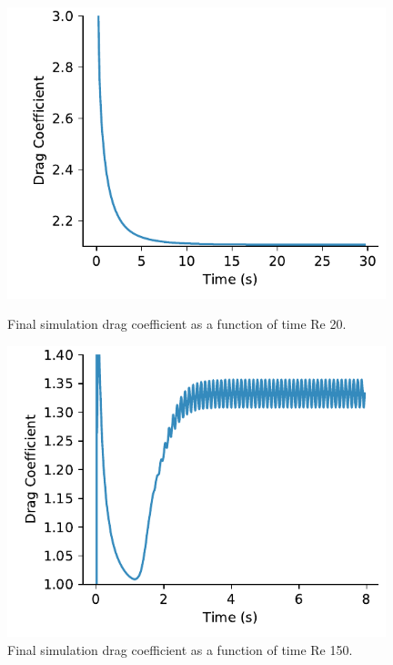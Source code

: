 \documentclass[10pt,english]{article}
\begin{document}
\begin{figure}[h]
\centering
\begin{minipage}{.49\textwidth}
  \centering
\includegraphics[trim={0.0cm 0cm 0.0cm 0cm},clip,width=0.98\textwidth]{CD_time_20}
\caption{Final simulation drag coefficient as a function of time Re 20.}
\label{f:CD_time_20}
\end{minipage}%
\hspace{5pt}
\begin{minipage}{.49\textwidth}
  \centering
\includegraphics[trim={0.0cm 0cm 0.0cm 0cm},clip,width=0.98\textwidth]{CD_time_150}
\caption{\vspace{0pt}Final simulation drag coefficient as a function of time Re 150.}
\label{f:CD_time_150}
\end{minipage}
\end{figure}
\end{document}

